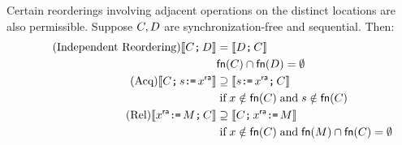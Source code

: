  
Certain reorderings involving adjacent operations on the distinct locations
are also permissible. 
Suppose  $\aCmd,\bCmd$ are synchronization-free and sequential.   Then:
\begin{align*}
\tag{Independent Reordering}
\sem{\aCmd \SEMI \bCmd} &= \sem{\bCmd \SEMI \aCmd} \\
& \free(\aCmd) \cap \free(\bCmd) = \emptyset \\
\tag{Acq}
    \sem{\aCmd \SEMI \bReg \GETS \aLoc \ACQ} &\supseteq
    \sem{\bReg \GETS \aLoc \ACQ\SEMI  \aCmd} \\
&\textif \aLoc\notin\free(\aCmd) \textand \bReg\notin\free(\aCmd) \\
\tag{Rel}
    \sem{\aLoc \REL \GETS \aExp \SEMI \aCmd } &\supseteq
    \sem{\aCmd \SEMI \aLoc \REL \GETS \aExp } \\
&\textif \aLoc\notin\free(\aCmd) \textand \free(\aExp) \cap \free(\aCmd) = \emptyset 
\end{align*}


